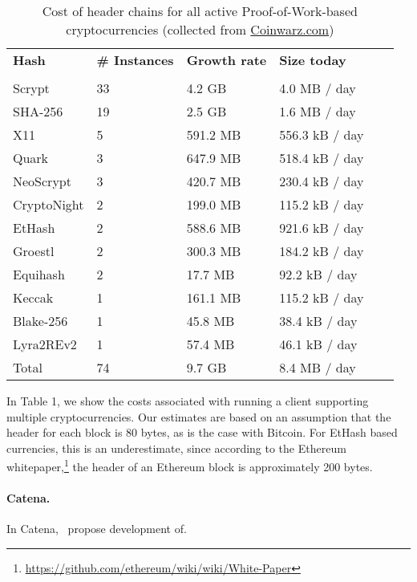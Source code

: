 \begin{table}
  \caption{Cost of header chains for all active Proof-of-Work-based cryptocurrencies (collected from \url{Coinwarz.com})}
\small
  \begin{tabular}{l|ll|ll}
    {\bf Hash} & {\bf \# Instances} & {\bf Growth rate} & {\bf Size today} &  \\\\
    Scrypt  & 33  & 4.2 GB  & 4.0 MB / day \  \\
    SHA-256  & 19  & 2.5 GB  & 1.6 MB / day \  \\
    X11  & 5  & 591.2 MB  & 556.3 kB / day \  \\
    Quark  & 3  & 647.9 MB  & 518.4 kB / day \  \\
    NeoScrypt  & 3  & 420.7 MB  & 230.4 kB / day \  \\
    CryptoNight  & 2  & 199.0 MB  & 115.2 kB / day \  \\
    EtHash  & 2  & 588.6 MB  & 921.6 kB / day \  \\
    Groestl  & 2  & 300.3 MB  & 184.2 kB / day \  \\
    Equihash  & 2  & 17.7 MB  & 92.2 kB / day \  \\
    Keccak  & 1  & 161.1 MB  & 115.2 kB / day \  \\
    Blake-256  & 1  & 45.8 MB  & 38.4 kB / day \  \\
    Lyra2REv2  & 1  & 57.4 MB  & 46.1 kB / day \  \\
    \hline
    Total  & 74   &  9.7 GB  & 8.4 MB  / day  \\
  \end{tabular}
\end{table}

In Table 1, we show the costs associated with running a client supporting multiple cryptocurrencies. Our estimates are based on an assumption that the header for each block is 80 bytes, as is the case with Bitcoin. For EtHash based currencies, this is an underestimate, since according to the Ethereum whitepaper,\footnote{\url{https://github.com/ethereum/wiki/wiki/White-Paper}}
the header of an Ethereum block is approximately 200 bytes.

\paragraph{Catena.}

In Catena,~\cite{} propose development of.


